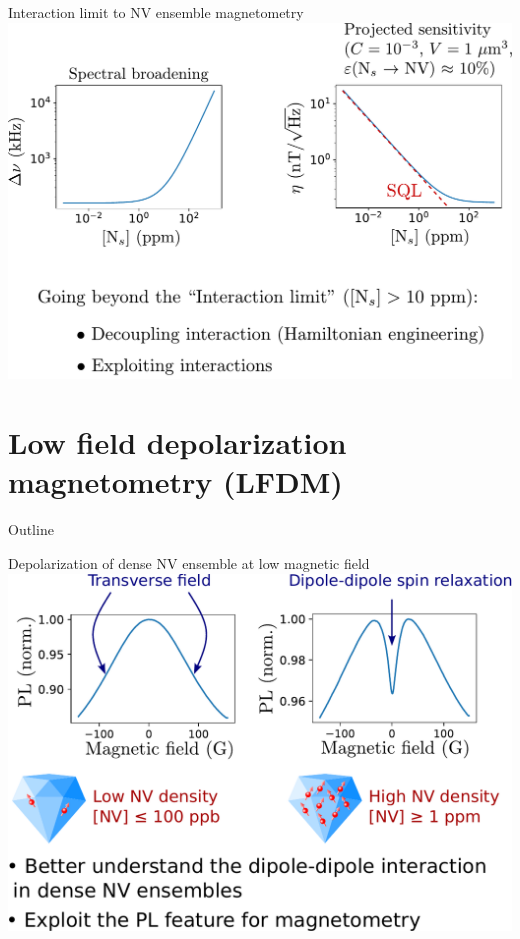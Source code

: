 \documentclass{beamer}
\begin{document}
\begin{frame}{Interaction limit to NV ensemble magnetometry}
\centering
\includegraphics[width=\textwidth,height=0.9\textheight,keepaspectratio]{Slide_interaction_limit}
\end{frame}



\section{Low field depolarization magnetometry (LFDM)}
\begin{frame}{Outline}
\tableofcontents[currentsection]
\end{frame}

\begin{frame}{Depolarization of dense NV ensemble at low magnetic field}
\centering
\includegraphics[width=\textwidth,height=0.9\textheight,keepaspectratio]{slide_presentation_sujet}
\end{frame}
\end{document}
